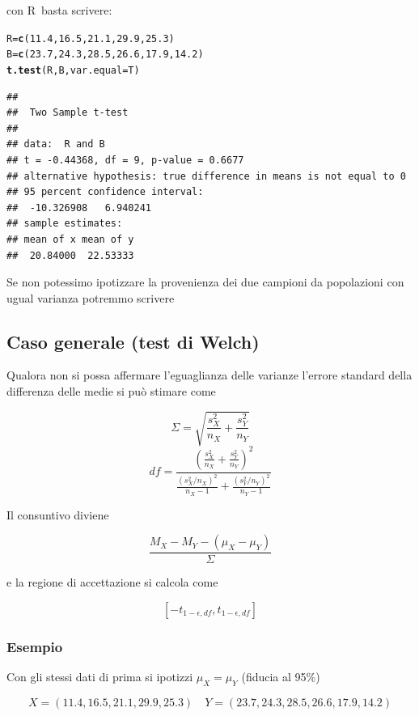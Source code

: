 \documentclass[onecolumn,12pt]{book}\usepackage[]{graphicx}\usepackage[]{color}
\makeatletter
\newcommand{\hlnum}[1]{\textcolor[rgb]{0.686,0.059,0.569}{#1}}%
\newcommand{\hlstd}[1]{\textcolor[rgb]{0.345,0.345,0.345}{#1}}%
\newcommand{\hlkwb}[1]{\textcolor[rgb]{0.69,0.353,0.396}{#1}}%
\newcommand{\hlkwc}[1]{\textcolor[rgb]{0.333,0.667,0.333}{#1}}%
\newcommand{\hlkwd}[1]{\textcolor[rgb]{0.737,0.353,0.396}{\textbf{#1}}}%
\newenvironment{kframe}{%
 \def\at@end@of@kframe{}%
 \ifinner\ifhmode%
  \def\at@end@of@kframe{\end{minipage}}%
  \begin{minipage}{\columnwidth}%
 \fi\fi%
 \def\FrameCommand##1{\hskip\@totalleftmargin \hskip-\fboxsep
 \colorbox{shadecolor}{##1}\hskip-\fboxsep
     \hskip-\linewidth \hskip-\@totalleftmargin \hskip\columnwidth}%
 \MakeFramed {\advance\hsize-\width
   \@totalleftmargin\z@ \linewidth\hsize
   \@setminipage}}%
 {\par\unskip\endMakeFramed%
 \at@end@of@kframe}
\newenvironment{knitrout}{}{} %
\newcommand{\rpr}{\textsf{R}~}
\makeatother
\begin{document}
con \rpr basta scrivere:
\begin{knitrout}
\color{fgcolor}\begin{kframe}
\begin{alltt}
\hlstd{R}\hlkwb{=}\hlkwd{c}\hlstd{(}\hlnum{11.4}\hlstd{,}\hlnum{16.5}\hlstd{,}\hlnum{21.1}\hlstd{,}\hlnum{29.9}\hlstd{,}\hlnum{25.3}\hlstd{)}
\hlstd{B}\hlkwb{=}\hlkwd{c}\hlstd{(}\hlnum{23.7}\hlstd{,}\hlnum{24.3}\hlstd{,}\hlnum{28.5}\hlstd{,}\hlnum{26.6}\hlstd{,} \hlnum{17.9}\hlstd{,}\hlnum{14.2}\hlstd{)}
\hlkwd{t.test}\hlstd{(R,B,}\hlkwc{var.equal}\hlstd{=T)}
\end{alltt}
\begin{verbatim}
## 
## 	Two Sample t-test
## 
## data:  R and B
## t = -0.44368, df = 9, p-value = 0.6677
## alternative hypothesis: true difference in means is not equal to 0
## 95 percent confidence interval:
##  -10.326908   6.940241
## sample estimates:
## mean of x mean of y 
##  20.84000  22.53333
\end{verbatim}
\end{kframe}
\end{knitrout}
Se non potessimo ipotizzare la provenienza dei due campioni da popolazioni con ugual varianza potremmo scrivere

\subsection{Caso generale (test di Welch)}

Qualora non si possa affermare l'eguaglianza delle varianze l'errore standard della differenza delle medie si può stimare come

\[ \Sigma= \sqrt{\frac{s_X^2}{n_X}+\frac{s_Y^2}{n_Y}}\]
\[ df =\dfrac
{ \left(\frac{s_X^2}{n_X}+\frac{s_Y^2}{n_Y}\right)^2}
{
\frac{(s_X^2/n_X)^2}{n_X-1}+
\frac{(s_Y^2/n_Y)^2}{n_Y-1}
}\]

Il consuntivo diviene

\[\frac{M_X-M_Y-(\mu_X-\mu_Y)}{\Sigma}  \]

e la regione di accettazione si calcola come

\[ [-t_{1-\epsilon,df},t_{1-\epsilon,df}]\]


\subsubsection{Esempio}
Con gli stessi dati di prima si ipotizzi $\mu_X=\mu_Y$ (fiducia al 95\%)

\[ X=(11.4, 16.5, 21.1, 29.9, 25.3)\quad Y=(23.7, 24.3, 28.5, 26.6, 17.9, 14.2)\]
\end{document}
